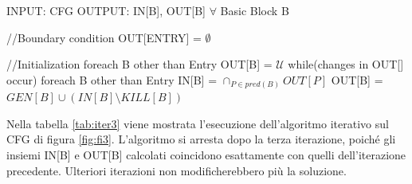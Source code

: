 \documentclass[a4paper, 9pt]{article}
\begin{document}
\begin{myalgo}[style=mystyle]
INPUT: CFG
OUTPUT: IN[B], OUT[B] $\forall$ Basic Block B 

//Boundary condition 
OUT[ENTRY] = $\emptyset$

//Initialization
foreach B other than Entry 
    OUT[B] = $\mathcal{U}$
while(changes in OUT[] occur){
    foreach B other than Entry {
        IN[B] = $\cap_{P \in pred(B)}OUT[P]$
        OUT[B] = $GEN[B] \cup (IN[B] \setminus KILL[B])$
    }
}
\end{myalgo}
Nella tabella \ref{tab:iter3} viene mostrata l'esecuzione dell'algoritmo iterativo sul CFG di figura \ref{fig:fi3}. L'algoritmo si arresta dopo la terza iterazione, poiché gli insiemi IN[B] e OUT[B] calcolati coincidono esattamente con quelli dell'iterazione precedente. Ulteriori iterazioni non modificherebbero più la soluzione.\\
\end{document}
